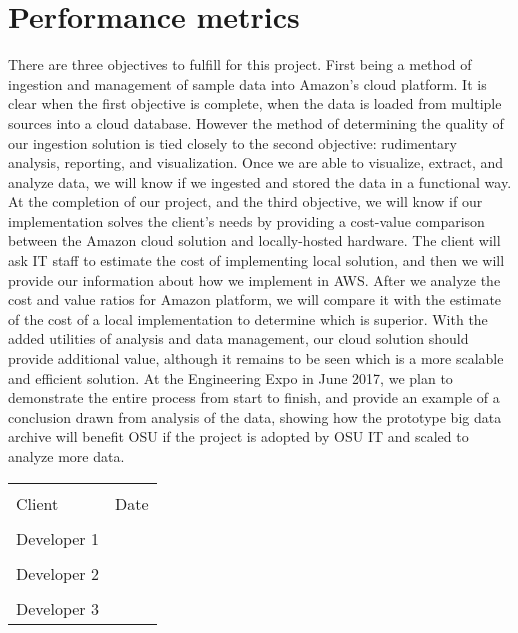 \documentclass[letterpaper,10pt]{article}
\begin{document}
	\section{Performance metrics}
	There are three objectives to fulfill for this project. First being a method of ingestion and management of sample data into Amazon’s cloud platform. It is clear when the first objective is complete, when the data is loaded from multiple sources into a cloud database. However the method of determining the quality of our ingestion solution is tied closely to the second objective: rudimentary analysis, reporting, and visualization. Once we are able to visualize, extract, and analyze data, we will know if we ingested and stored the data in a functional way. At the completion of our project, and the third objective, we will know if our implementation solves the client’s needs by providing a cost-value comparison between the Amazon cloud solution and locally-hosted hardware. The client will ask IT staff to estimate the cost of implementing local solution, and then we will provide our information about how we implement in AWS. After we analyze the cost and value ratios for Amazon platform, we will compare it with the estimate of the cost of a local implementation to determine which is superior. With the added utilities of analysis and data management, our cloud solution should provide additional value, although it remains to be seen which is a more scalable and efficient solution. At the Engineering Expo in June 2017, we plan to demonstrate the entire process from start to finish, and provide an example of a conclusion drawn from analysis of the data, showing how the prototype big data archive will benefit OSU if the project is adopted by OSU IT and scaled to analyze more data.

	\newpage
	\noindent\begin{tabular}{ll}
	\makebox[2.5in]{\hrulefill} & \makebox[2.5in]{\hrulefill}\\
	Client & Date\\[8ex]%
	\makebox[2.5in]{\hrulefill}\\
	Developer 1\\[8ex]
	\makebox[2.5in]{\hrulefill}\\
	Developer 2\\[8ex]
	\makebox[2.5in]{\hrulefill}\\
	Developer 3\\[8ex]
	\end{tabular}
\end{document}
